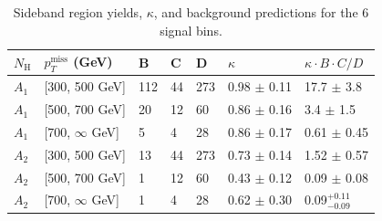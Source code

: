 \begin{table}
\centering
\caption{
Sideband region yields, $\kappa$, and background predictions for the 6 signal bins.
}
\begin{tabular}{lllllll}
\hline
\hline
$N_{\mathrm{H}}$ & $p_{T}^{\mathrm{miss}}$ (GeV) & B & C & D & $\kappa$  & $\kappa \cdot B \cdot C / D$ \\
\hline
$A_{1}$ & [300, 500 GeV]      & 112 & 44  & 273 & 0.98 $\pm$ 0.11 & 17.7 $\pm$ 3.8\\
$A_{1}$ & [500, 700 GeV]      & 20   & 12  & 60   & 0.86 $\pm$ 0.16 & 3.4  $\pm$ 1.5\\
$A_{1}$ & [700, $\infty$ GeV] & 5    & 4    & 28   & 0.86 $\pm$ 0.17 & 0.61 $\pm$ 0.45\\
$A_{2}$ & [300, 500 GeV]      & 13   & 44  & 273 & 0.73 $\pm$ 0.14 & 1.52 $\pm$ 0.57\\
$A_{2}$ & [500, 700 GeV]      & 1     & 12  & 60   & 0.43 $\pm$ 0.12 & 0.09 $\pm$ 0.08\\
$A_{2}$ & [700, $\infty$ GeV] & 1     & 4     & 28   & 0.62 $\pm$ 0.30 & 0.09$^{+0.11}_{-0.09}$\\
\hline
\hline
\end{tabular}
\label{tab:tab}
\end{table}

